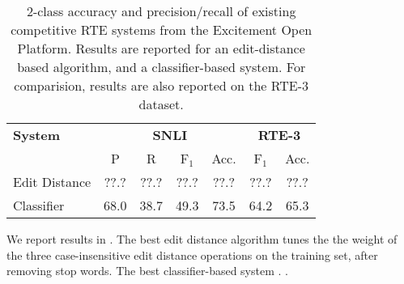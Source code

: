 %
%
\def\t#1{\small{#1}}
\def\b#1{\t{\textbf{#1}}}
\def\colspaceS{2.0mm}
\def\colspaceM{3.0mm}
\def\colspaceL{4.0mm}

\begin{table}
\begin{center}
\begin{tabular}{l@{\hskip \colspaceL}c@{\hskip \colspaceS}c@{\hskip \colspaceS}c@{\hskip \colspaceS}c@{\hskip \colspaceL}c@{\hskip \colspaceS}c}
\hline
\textbf{System} & \multicolumn{4}{c}{\b{SNLI}} & \multicolumn{2}{c}{\b{RTE-3}} \\
 & \t{P} & \t{R} & \t{F$_1$} & \t{Acc.} & \t{F$_1$} & \t{Acc.} \\
\hline
\t{Edit Distance} & \t{??.?} & \t{??.?} & \t{??.?} & \t{??.?} & 
                    \t{??.?} & \t{??.?} \\
\t{Classifier}    & \t{68.0} & \t{38.7} & \t{49.3} & \t{73.5} & 
                    \t{64.2} & \t{65.3} \\
\hline
\end{tabular}
\end{center}
\caption{
\label{tab:eopresults}
2-class accuracy and precision/recall of existing competitive RTE
systems from the Excitement Open Platform.
Results are reported for an edit-distance based algorithm, and a
  classifier-based system.
For comparision, results are also reported on the RTE-3 dataset.
}
\end{table}
%
%

We report results in .
The best edit distance algorithm tunes the the weight of the three 
  case-insensitive edit distance operations on the training set, 
  after removing stop words.
The best classifier-based system .
.

%
%
